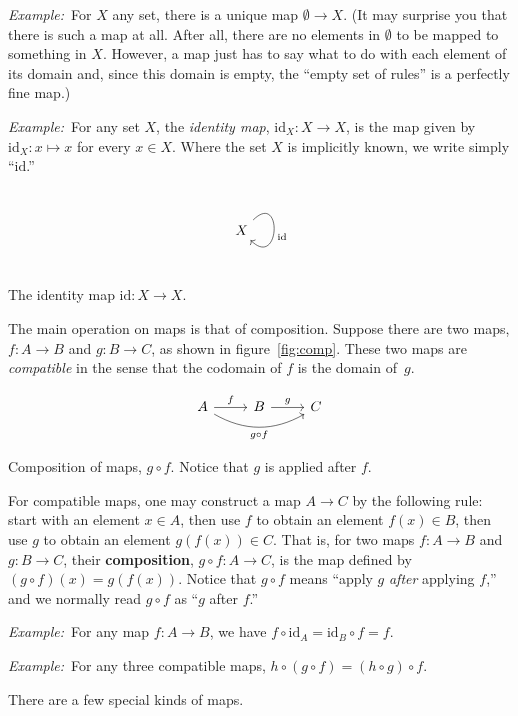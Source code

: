 \documentclass[12pt, a4paper]{article}
\newcommand{\defn}[1]{\textbf{#1}}
\newcommand{\eg}{\emph{Example:}\relax}
\newcommand{\id}{\text{id}}
\begin{document}
\eg\ For $X$ any set, there is a unique map $\emptyset \to X$. (It may surprise
you that there is such a map at all. After all, there are no elements
in $\emptyset$ to be mapped to something in $X$. However, a map just has to
say what to do with each element of its domain and, since this domain
is empty, the “empty set of rules” is a perfectly fine map.)

\eg\ For any set $X$, the \emph{identity map}, $\id_X\colon X \to X$, is
the map given by $\id_X\colon x \mapsto x$ for every $x\in X$. Where the set
$X$ is implicitly known, we write simply “$\id$.”
\begin{sidefigure}
\[\begin{tikzcd}
    X \arrow[loop right, out=45, in=-45, distance=3em, "\id"]
  \end{tikzcd}\]
  \caption{The identity map $\id\colon X\to X$.}
\end{sidefigure}

The main operation on maps is that of composition. Suppose there are
two maps, $f\colon A\to B$ and $g\colon B\to C$, as shown in
figure~\ref{fig:comp}. These two maps are \emph{compatible} in the
sense that the codomain of $f$ is the domain of~$g$.
\begin{sidefigure}
  \[
  \begin{tikzcd}
    A \arrow [rr, bend right, "g \circ f"' ] \arrow[r, "f"] & B \arrow[r, "g"] & C 
  \end{tikzcd}
  \]
  \caption{Composition of maps, $g \circ f$. Notice that $g$ is applied
    after $f$.\label{fig:comp}}
\end{sidefigure}
For compatible maps, one may construct a map $A\to C$ by the following
rule: start with an element $x\in A$, then use $f$ to obtain an element
$f(x)\in B$, then use $g$ to obtain an element $g(f(x))\in C$. That is,
for two maps $f\colon A \to B$ and $g\colon B \to C$, their
\defn{composition}, $g\circ f\colon A \to C$, is the map defined by $(g\circ
f)(x) = g(f(x))$. Notice that $g\circ f$ means “apply $g$ \emph{after}
applying $f$,” and we normally read $g\circ f$ as “$g$ after
$f$.”
  
\eg\ For any map $f\colon A\to B$, we have $f\circ\id_A = \id_B\circ f = f$.

\eg\ For any three compatible maps, $h\circ (g\circ f) = (h\circ g)\circ f$.

There are a few special kinds of maps. 
\end{document}
